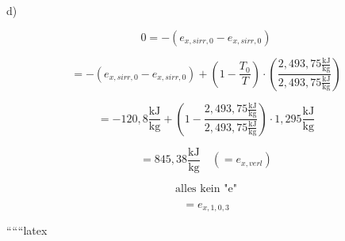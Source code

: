 d)
\]

\[
0 = - (e_{x,sirr,0} - e_{x,sirr,0})
\]

\[
= - (e_{x,sirr,0} - e_{x,sirr,0}) + \left( 1 - \frac{T_0}{T} \right) \cdot \left( \frac{2,493,75 \frac{\text{kJ}}{\text{kg}}}{2,493,75 \frac{\text{kJ}}{\text{kg}}} \right)
\]

\[
= -120,8 \frac{\text{kJ}}{\text{kg}} + \left( 1 - \frac{2,493,75 \frac{\text{kJ}}{\text{kg}}}{2,493,75 \frac{\text{kJ}}{\text{kg}}} \right) \cdot 1,295 \frac{\text{kJ}}{\text{kg}}
\]

\[
= 845,38 \frac{\text{kJ}}{\text{kg}} \quad (= e_{x,verl})
\]

\[
\text{alles kein "e"}
\]

\[
= e_{x,1,0,3}
\]

``````latex